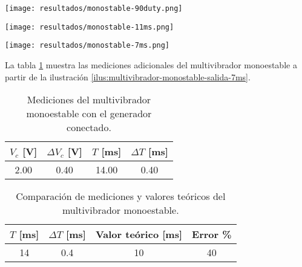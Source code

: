 \begin{ilustracion}
    \centering
    \texttt{[image: resultados/monostable-90duty.png]}
    \caption{Medición de voltajes del multivibrador monoestable (canal 1 $V_c$, canal 2 $V_c$). con un duty cycle del 90\% y T=13ms.}
    \label{ilus:multivibrador-monostable-salida}
\end{ilustracion}

\begin{ilustracion}
    \centering
    \texttt{[image: resultados/monostable-11ms.png]}
    \caption{Medición de voltajes del multivibrador monoestable (canal 1 $V_c$, canal 2 $V_c$). con un duty cycle del 10\% y T=11ms.}
    \label{ilus:multivibrador-monostable-salida-11ms}
\end{ilustracion}

\begin{ilustracion}
    \centering
    \texttt{[image: resultados/monostable-7ms.png]}
    \caption{Medición de voltajes del multivibrador monoestable (canal 1 $V_c$, canal 2 $V_c$). con un duty cycle del 10\% y T=7ms.}
    \label{ilus:multivibrador-monostable-salida-7ms}
\end{ilustracion}

La tabla \ref{tab:resultados-multivibrador-monostable-2} muestra las mediciones adicionales del multivibrador monoestable a partir de la ilustración \ref{ilus:multivibrador-monostable-salida-7ms}.

\begin{table}[ht]
\centering
\begin{tabular}{|c|c|c|c|}
\hline
\(V_c\) [V] & \(\Delta V_c\) [V] & \(T\) [ms] & \(\Delta T\) [ms]\\ \hline
2.00 & 0.40 & 14.00 & 0.40 \\ \hline
\end{tabular}
\caption{Mediciones del multivibrador monoestable con el generador conectado.}
\label{tab:resultados-multivibrador-monostable-2}
\end{table}

\begin{table}[ht]
\centering
\begin{tabular}{|c|c|c|c|}
\hline
\(T\) [ms] & \(\Delta T\) [ms] & Valor teórico [ms] & Error \% \\ \hline
14 & 0.4 & 10 & 40 \\ \hline
\end{tabular}
\caption{Comparación de mediciones y valores teóricos del multivibrador monoestable.}
\label{tab:comparacion-multivibrador-monostable}
\end{table}